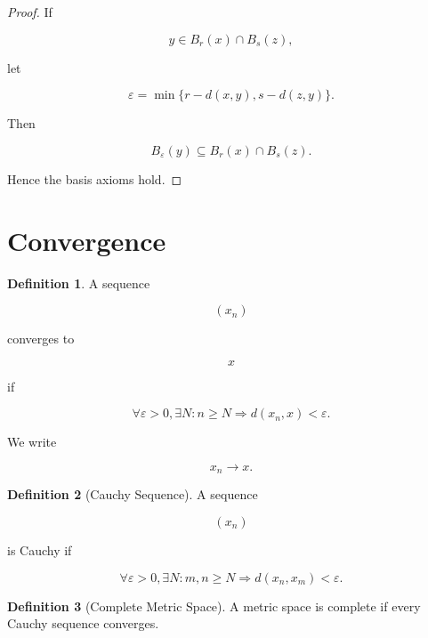 \documentclass[11pt]{book}
\numberwithin{equation}{chapter}
\theoremstyle{definition}
\newtheorem{definition}{Definition}[chapter]
\theoremstyle{plain}
\begin{document}
\begin{proof}

If

\[
y
\in
B_r(x)
\cap
B_s(z),
\]

let

\[
\varepsilon
=
\min
\{
r-d(x,y),
s-d(z,y)
\}.
\]

Then

\[
B_\varepsilon(y)
\subseteq
B_r(x)\cap B_s(z).
\]

Hence the basis axioms hold.

\end{proof}


\section{Convergence}

\begin{definition}

A sequence

\[
(x_n)
\]

converges to

\[
x
\]

if

\[
\forall\varepsilon>0,
\exists N
:
n\ge N
\Longrightarrow
d(x_n,x)<\varepsilon.
\]

We write

\[
x_n\to x.
\]

\end{definition}


\begin{definition}[Cauchy Sequence]

A sequence

\[
(x_n)
\]

is Cauchy if

\[
\forall\varepsilon>0,
\exists N
:
m,n\ge N
\Longrightarrow
d(x_n,x_m)<\varepsilon.
\]

\end{definition}


\begin{definition}[Complete Metric Space]

A metric space is complete if every Cauchy sequence converges.

\end{definition}
\end{document}

